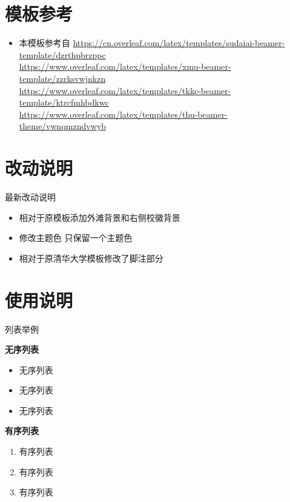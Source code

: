 \documentclass{beamer}
\begin{document}
\section{模板参考}

\begin{frame}
    \begin{itemize}
        \item 本模板参考自 \url{https://cn.overleaf.com/latex/templates/sudaiai-beamer-template/dzrthpbrzppc}\cite{origin1}\\
        \url{https://www.overleaf.com/latex/templates/xmu-beamer-template/zzrksvwjnkzn}\cite{origin2}\\
        \url{https://www.overleaf.com/latex/templates/tkkc-beamer-template/ktrcfmhbdkwc}\cite{origin3}\\
        \url{https://www.overleaf.com/latex/templates/thu-beamer-theme/vwnqmzndvwyb}\cite{origin4}
    \end{itemize}
\end{frame}


\section{改动说明}

\begin{frame}{最新改动说明}
    \begin{itemize}
        \item 相对于原模板添加外滩背景和右侧校徽背景
        \item 修改主题色 只保留一个主题色
        \item 相对于原清华大学模板修改了脚注部分
    \end{itemize}
\end{frame}
\section{使用说明}

\begin{frame}{列表举例}
	\begin{block}{\textbf{无序列表}}
		\begin{itemize}
			\item 无序列表
			\item 无序列表
			\item 无序列表
		\end{itemize}
	\end{block}
	
	\begin{block}{\textbf{有序列表}}
		\begin{enumerate}
			\item 有序列表
			\item 有序列表
			\item 有序列表
		\end{enumerate}
	\end{block}
\end{frame}
\end{document}
